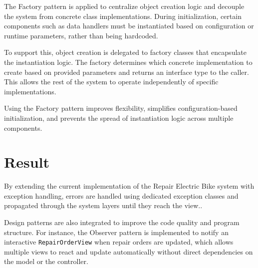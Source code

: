 \documentclass[a4paper]{scrartcl}
\begin{document}
The Factory pattern is applied to centralize object creation logic and decouple the system from concrete class implementations. During initialization, certain components such as data handlers must be instantiated based on configuration or runtime parameters, rather than being hardcoded.

To support this, object creation is delegated to factory classes that encapsulate the instantiation logic. The factory determines which concrete implementation to create based on provided parameters and returns an interface type to the caller. This allows the rest of the system to operate independently of specific implementations.

Using the Factory pattern improves flexibility, simplifies configuration-based initialization, and prevents the spread of instantiation logic across multiple components.

\section{Result}
\label{sec:result}


By extending the current implementation of the Repair Electric Bike system with exception handling, errors are handled using dedicated exception classes and propagated through the system layers until they reach the view..

Design patterns are also integrated to improve the code quality and program structure. For instance, the Observer pattern is implemented to notify an interactive \texttt{RepairOrderView} when repair orders are updated, which allows multiple views to react and update automatically without direct dependencies on the model or the controller.
\end{document}
